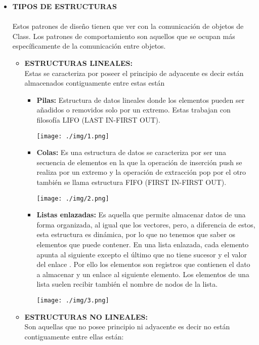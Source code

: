 \documentclass[twoside,twocolumn]{article}
\begin{document}
\begin{itemize}
	\item \textbf{TIPOS DE ESTRUCTURAS}
	\\
	\\Estos patrones de diseño tienen que ver con la comunicación de objetos de Class. Los patrones de comportamiento son aquellos que se ocupan más específicamente de la comunicación entre objetos.
	\begin{itemize}
		\item \textbf{ESTRUCTURAS LINEALES:} \\Estas se caracteriza por poseer el principio de adyacente es decir están almacenados contiguamente entre estas están
        \begin{itemize}
            \item \textbf{Pilas:} Estructura de datos lineales donde los elementos pueden ser añadidos o removidos solo por un extremo. Estas trabajan con filosofía LIFO (LAST IN-FIRST OUT).
            \begin{center}
                \texttt{[image: ./img/1.png]} 
            \end{center}
            \item \textbf{Colas:} Es una estructura de datos se caracteriza por ser una secuencia de elementos en la que la operación de inserción push se realiza por un extremo y la operación de extracción pop por el otro también se llama estructura FIFO (FIRST IN-FIRST OUT).
            \begin{center}
                \texttt{[image: ./img/2.png]} 
            \end{center}
            \item \textbf{Listas enlazadas:} Es aquella que permite almacenar datos de una forma organizada, al igual que los vectores, pero, a diferencia de estos, esta estructura es dinámica, por lo que no tenemos que saber os elementos que puede contener. En una lista enlazada, cada elemento apunta al siguiente excepto el último que no tiene sucesor y el valor del enlace . Por ello los elementos son registros que contienen el dato a almacenar y un enlace al siguiente elemento. Los elementos de una lista suelen recibir también el nombre de nodos de la lista.
            \begin{center}
                \texttt{[image: ./img/3.png]} 
            \end{center}
        \end{itemize}
        \item \textbf{ESTRUCTURAS NO LINEALES: }\\ Son aquellas que no posee principio ni adyacente es decir no están contiguamente entre ellas están:

\end{itemize}
\end{itemize}
\end{document}
